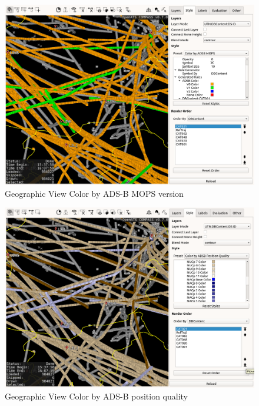 \begin{figure}[H]
    \hspace*{-2.5cm}
    \includegraphics[width=19cm,frame]{figures/geoview_style_adsb_mops.png}
  \caption{Geographic View Color by ADS-B MOPS version}
\end{figure}

\begin{figure}[H]
    \hspace*{-2.5cm}
    \includegraphics[width=19cm,frame]{figures/geoview_style_adsb_position_qual.png}
  \caption{Geographic View Color by ADS-B position quality}
\end{figure}

